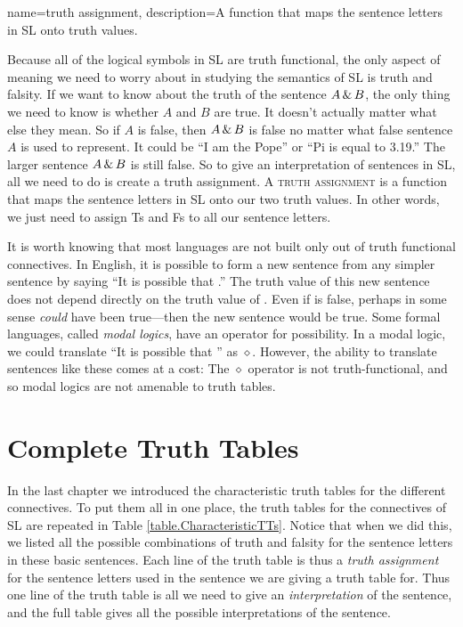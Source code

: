 {
name=truth assignment,
description={A function that maps the sentence letters in SL onto truth values.}
}

Because all of the logical symbols in SL are truth functional, the only aspect of meaning we need to worry about in studying the semantics of SL is truth and falsity. If we want to know about the truth of the sentence $A \,\&\, B$, the only thing we need to know is whether $A$ and $B$ are true. It doesn't actually matter what else they mean. So if $A$ is false, then $A \,\&\, B$ is false no matter what false sentence $A$ is used to represent. It could be ``I am the Pope'' or ``Pi is equal to 3.19.'' The larger sentence $A \,\&\, B$ is still false. So to give an interpretation of sentences in SL, all we need to do is create a truth assignment. A \textsc{\gls{truth assignment}} \label{def:truth_assignment}
 is a function that maps the sentence letters in SL onto our two truth values. In other words, we just need to assign Ts and Fs to all our sentence letters.

It is worth knowing that most languages are not built only out of truth functional connectives. In English, it is possible to form a new sentence from any simpler sentence  by saying ``It is possible that .'' The truth value of this new sentence does not depend directly on the truth value of . Even if  is false, perhaps in some sense  \emph{could} have been true---then the new sentence would be true. Some formal languages, called \emph{modal logics}, have an operator for possibility. In a modal logic, we could translate ``It is possible that '' as {\large $\diamond$}. However, the ability to translate sentences like these comes at a cost: The {\large $\diamond$} operator is not truth-functional, and so modal logics are not amenable to truth tables.

\section{Complete Truth Tables}

In the last chapter we introduced the characteristic truth tables for the different connectives. To put them all in one place, the truth tables for the connectives of SL are repeated in Table \ref{table.CharacteristicTTs}. Notice that when we did this, we listed all the possible combinations of truth and falsity for the sentence letters in these basic sentences. Each line of the truth table is thus a \emph{truth assignment} for the sentence letters used in the sentence we are giving a truth table for. Thus one line of the truth table is all we need to give an \emph{interpretation} of the sentence, and the full table gives all the possible interpretations of the sentence. 

